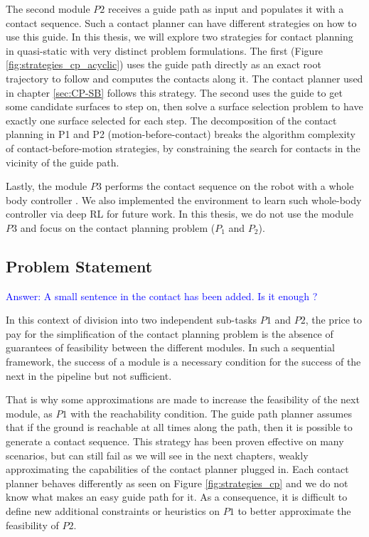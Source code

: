 The second module $P2$ receives a guide path as input and populates it with a contact sequence. Such a contact planner can have different strategies on how to use this guide. In this thesis, we will explore two strategies for contact planning in quasi-static with very distinct problem formulations. 
The first (Figure \ref{fig:strategies_cp_acyclic}) uses the guide path directly as an exact root trajectory to follow and computes the contacts along it. The contact planner used in chapter \ref{sec:CP-SB} follows this strategy.
The second uses the guide to get some candidate surfaces to step on, then solve a surface selection problem to have exactly one surface selected for each step.
The decomposition of the contact planning in P1 and P2 (motion-before-contact) breaks the algorithm complexity \cite{AcyclicCP,sl1m_v2} of contact-before-motion strategies, by constraining the search for contacts in the vicinity of the guide path.

Lastly, the module $P3$ performs the contact sequence on the robot with a whole body controller \cite{loco3d,tsid,2pac,deepLoco}. We also implemented the environment to learn such whole-body controller via deep RL \cite{software_robot_RL} for future work.
In this thesis, we do not use the module $P3$ and focus on the contact planning problem ($P_1$ and $P_2$).


\subsection{Problem Statement\label{subsub:problematic_leas}}
\textcolor{blue}{Answer: A small sentence in the contact has been added. Is it enough ?}

In this context of division into two independent sub-tasks $P1$ and $P2$, the price to pay for the simplification of the contact planning problem is the absence of guarantees of feasibility between the different modules.
In such a sequential framework, the success of a module is a necessary condition for the success of the next in the pipeline but not sufficient.

That is why some approximations are made to increase the feasibility of the next module, as $P1$ with the reachability condition. The guide path planner assumes that if the ground is reachable at all times along the path, then it is possible to generate a contact sequence. 
This strategy has been proven effective \cite{AcyclicCP} on many scenarios, but can still fail as we will see in the next chapters, weakly approximating the capabilities of the contact planner plugged in. Each contact planner behaves differently as seen on Figure \ref{fig:strategies_cp} and we do not know what makes an easy guide path for it. As a consequence, it is difficult to define new additional constraints or heuristics on $P1$ to better approximate the feasibility of $P2$.

